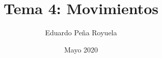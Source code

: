 \documentclass[a4paper,12pt]{article}
\title{Tema 4: Movimientos}
\author{Eduardo Peña Royuela}
\date{Mayo 2020}
\begin{document}
\maketitle



\pagebreak


\end{document}
